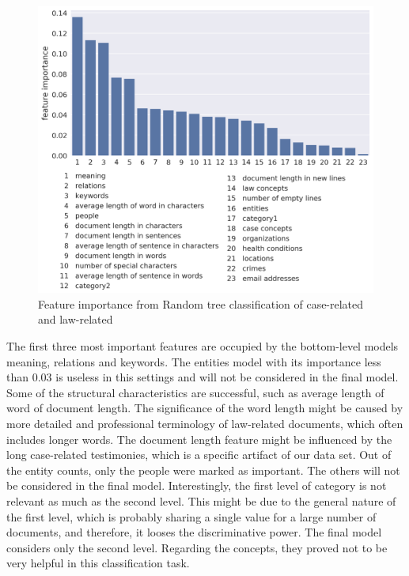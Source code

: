 \documentclass[
  digital, %
  notable,   %
  nolof,     %
  nolot,     %
]{fithesis3}
\begin{document}
\begin{figure}[h]
\caption{Feature importance from Random tree classification of case-related and law-related}
\label{fig:case_law_feature_importance}
\includegraphics[width=\textwidth]{img/case_law_feature_importance}
\end{figure}

The first three most important features are occupied by the bottom-level models meaning, relations and keywords.
The entities model with its importance less than $0.03$ is useless in this settings and will not be considered in the final model.
Some of the structural characteristics are successful, such as average length of word of document length.
The significance of the word length might be caused by more detailed and professional terminology of law-related documents, which often includes longer words.
The document length feature might be influenced by the long case-related testimonies, which is a specific artifact of our data set.
Out of the entity counts, only the people were marked as important.
The others will not be considered in the final model.
Interestingly, the first level of category is not relevant as much as the second level.
This might be due to the general nature of the first level, which is probably sharing a single value for a large number of documents, and therefore, it looses the discriminative power.
The final model considers only the second level.
Regarding the concepts, they proved not to be very helpful in this classification task.
\end{document}
